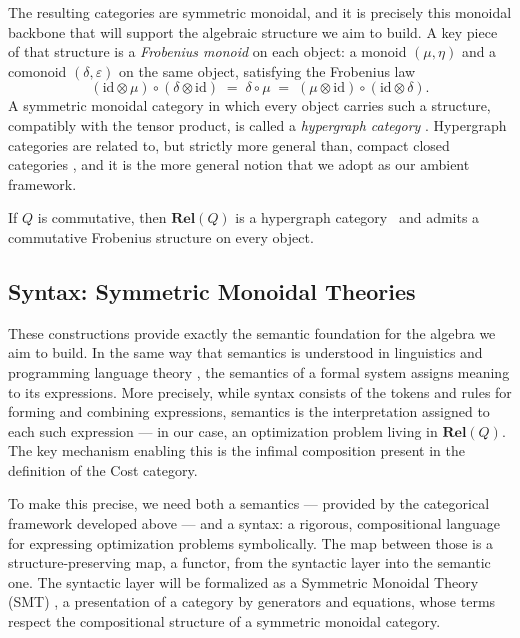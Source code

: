 The resulting categories are symmetric monoidal, and it is precisely this monoidal backbone that will support the algebraic structure we aim to build. A key piece of that structure is a \emph{Frobenius monoid} on each object: a monoid $(\mu, \eta)$ and a comonoid $(\delta, \varepsilon)$ on the same object, satisfying the Frobenius law
\[
	(\mathrm{id} \otimes \mu) \circ (\delta \otimes \mathrm{id})
	\;=\;
	\delta \circ \mu
	\;=\;
	(\mu \otimes \mathrm{id}) \circ (\mathrm{id} \otimes \delta).
\]
A symmetric monoidal category in which every object carries such a structure, compatibly with the tensor product, is called a \emph{hypergraph category} \cite{fong2019hypergraph}. Hypergraph categories are related to, but strictly more general than, compact closed categories \cite{selinger2010survey}, and it is the more general notion that we adopt as our ambient framework.

\begin{remark}
	If $Q$ is commutative, then $\mathbf{Rel}(Q)$ is a hypergraph category~\cite{fong2019hypergraph} and admits a commutative Frobenius structure on every object.
\end{remark}

\subsection{Syntax: Symmetric Monoidal Theories}

These constructions provide exactly the semantic foundation for the algebra we aim to build. In the same way that semantics is understood in linguistics and programming language theory \cite{winskel1993formal}, the semantics of a formal system assigns meaning to its expressions. More precisely, while syntax consists of the tokens and rules for forming and combining expressions, semantics is the interpretation assigned to each such expression --- in our case, an optimization problem living in $\mathbf{Rel}(Q)$. The key mechanism enabling this is the infimal composition present in the definition of the Cost category.

To make this precise, we need both a semantics --- provided by the categorical framework developed above --- and a syntax: a rigorous, compositional language for expressing optimization problems symbolically.
The map between those is a structure-preserving map, a functor, from the syntactic layer into the semantic one.
The syntactic layer will be formalized as a Symmetric Monoidal Theory (SMT) \cite{bonchi2017interacting}, a presentation of a category by generators and equations, whose terms respect the compositional structure of a symmetric monoidal category.

